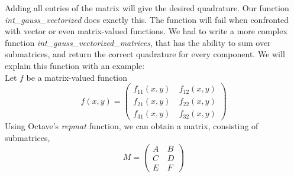Adding all entries of the matrix will give the desired quadrature. Our function \textit{int\_gauss\_vectorized} does exactly this. The function will fail when confronted with vector or even matrix-valued functions. We had to write a more complex function \textit{int\_gauss\_vectorized\_matrices}, that has the ability to sum over submatrices, and return the correct quadrature for every component. We will explain this function with an example:\\
Let $f$ be a matrix-valued function
\begin{equation}f(x,y)=\begin{pmatrix} f_{1 1}(x,y) &\ f_{1 2}(x,y) \\
						 f_{2 1}(x,y) &\ f_{2 2}(x,y) \\
                         f_{3 1}(x,y) &\ f_{3 2}(x,y) \end{pmatrix}
\end{equation}
Using Octave's \textit{repmat} function, we can obtain a matrix, consisting of submatrices,
\[M=\begin{pmatrix} A &\ B \\
			      C &\ D \\
                  E &\ F \end{pmatrix}\]

